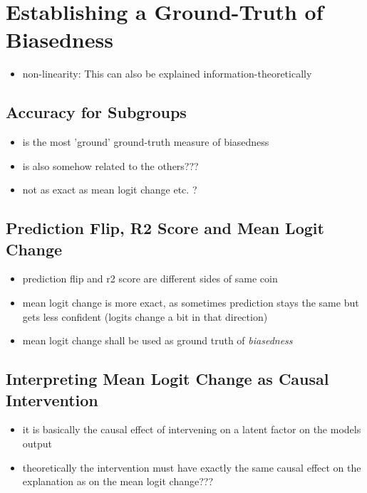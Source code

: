 \section{Establishing a Ground-Truth of Biasedness}
\begin{itemize}
    \item non-linearity: This can also be explained information-theoretically 
\end{itemize}

\subsection{Accuracy for Subgroups}
\begin{itemize}
    \item is the most 'ground' ground-truth measure of biasedness
    \item is also somehow related to the others??? 
    \item not as exact as mean logit change etc. ?
\end{itemize}

\subsection{Prediction Flip, R2 Score and Mean Logit Change}
\begin{itemize}
    \item prediction flip and r2 score are different sides of same coin
    \item mean logit change is more exact, as sometimes prediction stays the same but gets less confident (logits change a bit in that direction)
    \item mean logit change shall be used as ground truth of \textit{biasedness}
\end{itemize}

\subsection{Interpreting Mean Logit Change as Causal Intervention}
\begin{itemize}
    \item it is basically the causal effect of intervening on a latent factor on the models output
    \item theoretically the intervention must have exactly the same causal effect on the explanation as on the mean logit change???
\end{itemize}

